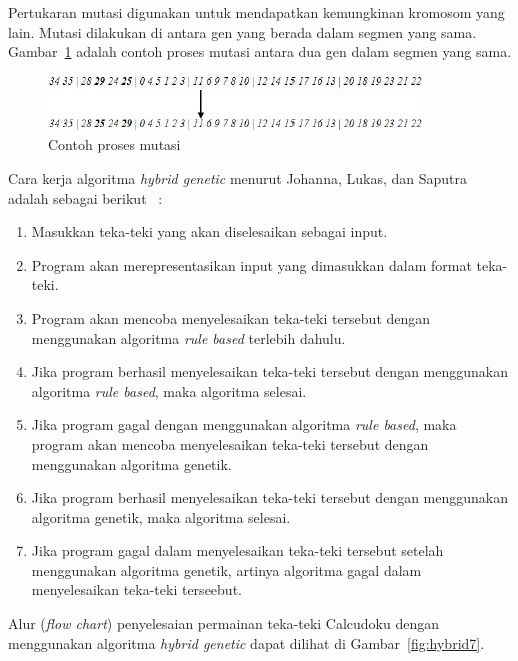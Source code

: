 \documentclass[a4paper,twoside]{article}
\begin{document}
\begin{enumerate}
Pertukaran mutasi digunakan untuk mendapatkan kemungkinan kromosom yang lain. Mutasi dilakukan di antara gen yang berada dalam segmen yang sama. Gambar~\ref{fig:hybrid10} adalah contoh proses mutasi antara dua gen dalam segmen yang sama.

\begin{figure}
\centering
\captionsetup{justification=centering}
\includegraphics[scale=1]{Gambar/HybridGenetic10}
\caption[Contoh proses mutasi ~\cite{JohannaLukasSaputra}]{Contoh proses mutasi ~\cite{JohannaLukasSaputra}}
\label{fig:hybrid10}
\end{figure}

Cara kerja algoritma \textit{hybrid genetic} menurut Johanna, Lukas, dan Saputra adalah sebagai berikut ~\cite{JohannaLukasSaputra}:
\begin{enumerate}
\item Masukkan teka-teki yang akan diselesaikan sebagai input.
\item Program akan merepresentasikan input yang dimasukkan dalam format teka-teki.
\item Program akan mencoba menyelesaikan teka-teki tersebut dengan menggunakan algoritma \textit{rule based} terlebih dahulu.
\item Jika program berhasil menyelesaikan teka-teki tersebut dengan menggunakan algoritma \textit{rule based}, maka algoritma selesai.
\item Jika program gagal dengan menggunakan algoritma \textit{rule based}, maka program akan mencoba menyelesaikan teka-teki tersebut dengan menggunakan algoritma genetik.
\item Jika program berhasil menyelesaikan teka-teki tersebut dengan menggunakan algoritma genetik, maka algoritma selesai.
\item Jika program gagal dalam menyelesaikan teka-teki tersebut setelah menggunakan algoritma genetik, artinya algoritma gagal dalam menyelesaikan teka-teki terseebut.
\end{enumerate}
Alur (\textit{flow chart}) penyelesaian permainan teka-teki Calcudoku dengan menggunakan algoritma \textit{hybrid genetic} dapat dilihat di Gambar~\ref{fig:hybrid7}.


\end{enumerate}
\end{document}
